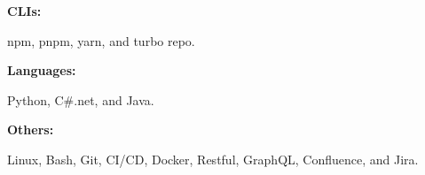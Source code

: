 \documentclass[8pt]{developercv} %
\begin{document}
\begin{minipage}[t]{0.47\textwidth}
        \begin{minipage}[t]{0.2\textwidth}
            \textbf{CLIs:}
        \end{minipage}
        \hfill
        \begin{minipage}[t]{0.73\textwidth}
            npm, pnpm, yarn, and turbo repo.
        \end{minipage}
        \vspace{4pt}

        \begin{minipage}[t]{0.2\textwidth}
            \textbf{Languages:}
        \end{minipage}
        \hfill
        \begin{minipage}[t]{0.73\textwidth}
            Python, C\#.net, and Java.
        \end{minipage}
        \vspace{4pt}

        \begin{minipage}[t]{0.2\textwidth}
            \textbf{Others:}
        \end{minipage}
        \hfill
        \begin{minipage}[t]{0.73\textwidth}
            Linux, Bash, Git, CI/CD, Docker, Restful, GraphQL, Confluence, and Jira.
        \end{minipage}
        \vspace{4pt}

    \end{minipage}
\end{document}
